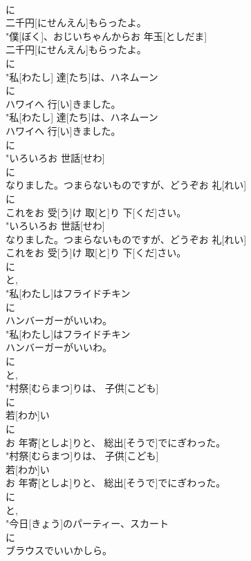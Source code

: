 \documentclass[8pt]{extreport}
\begin{document}
\begin{CJK}{UTF8}{min}
\\	に
\\	二千円[にせんえん]もらったよ。
\\	"僕[ぼく]、おじいちゃんからお 年玉[としだま]
\\	二千円[にせんえん]もらったよ。
\\	に
\\	"私[わたし] 達[たち]は、ハネムーン
\\	に
\\	ハワイへ 行[い]きました。
\\	"私[わたし] 達[たち]は、ハネムーン
\\	ハワイへ 行[い]きました。
\\	に
\\	"いろいろお 世話[せわ]
\\	に
\\	なりました。つまらないものですが、どうぞお 礼[れい]
\\	に
\\	これをお 受[う]け 取[と]り 下[くだ]さい。
\\	"いろいろお 世話[せわ]
\\	なりました。つまらないものですが、どうぞお 礼[れい]
\\	これをお 受[う]け 取[と]り 下[くだ]さい。
\\	に
\\	と, 
\\	"私[わたし]はフライドチキン
\\	に
\\	ハンバーガーがいいわ。
\\	"私[わたし]はフライドチキン
\\	ハンバーガーがいいわ。
\\	に
\\	と, 
\\	"村祭[むらまつ]りは、 子供[こども]
\\	に
\\	若[わか]い
\\	に
\\	お 年寄[としよ]りと、 総出[そうで]でにぎわった。
\\	"村祭[むらまつ]りは、 子供[こども]
\\	若[わか]い
\\	お 年寄[としよ]りと、 総出[そうで]でにぎわった。
\\	に
\\	と, 
\\	"今日[きょう]のパーティー、スカート
\\	に
\\	ブラウスでいいかしら。

\end{CJK}
\end{document}
